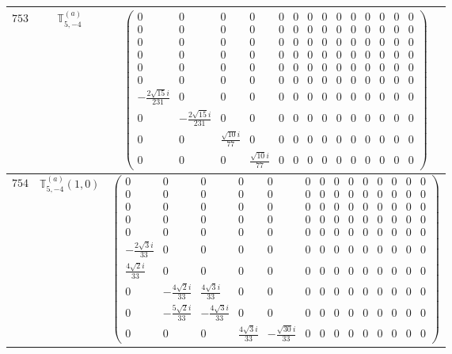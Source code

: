 \documentclass[fleqn,8pt,landscape]{jsarticle}
\begin{document}
\begin{center}
\begin{longtable}{ccc}
$ 753 $ & $ \mathbb{T}_{5,-4}^{(a)} $ & $ \begin{pmatrix} 0 & 0 & 0 & 0 & 0 & 0 & 0 & 0 & 0 & 0 & 0 & 0 & 0 & 0 \\ 0 & 0 & 0 & 0 & 0 & 0 & 0 & 0 & 0 & 0 & 0 & 0 & 0 & 0 \\ 0 & 0 & 0 & 0 & 0 & 0 & 0 & 0 & 0 & 0 & 0 & 0 & 0 & 0 \\ 0 & 0 & 0 & 0 & 0 & 0 & 0 & 0 & 0 & 0 & 0 & 0 & 0 & 0 \\ 0 & 0 & 0 & 0 & 0 & 0 & 0 & 0 & 0 & 0 & 0 & 0 & 0 & 0 \\ 0 & 0 & 0 & 0 & 0 & 0 & 0 & 0 & 0 & 0 & 0 & 0 & 0 & 0 \\ - \frac{2 \sqrt{15} i}{231} & 0 & 0 & 0 & 0 & 0 & 0 & 0 & 0 & 0 & 0 & 0 & 0 & 0 \\ 0 & - \frac{2 \sqrt{15} i}{231} & 0 & 0 & 0 & 0 & 0 & 0 & 0 & 0 & 0 & 0 & 0 & 0 \\ 0 & 0 & \frac{\sqrt{10} i}{77} & 0 & 0 & 0 & 0 & 0 & 0 & 0 & 0 & 0 & 0 & 0 \\ 0 & 0 & 0 & \frac{\sqrt{10} i}{77} & 0 & 0 & 0 & 0 & 0 & 0 & 0 & 0 & 0 & 0 \end{pmatrix} $ \\ \hline
$ 754 $ & $ \mathbb{T}_{5,-4}^{(a)}(1,0) $ & $ \begin{pmatrix} 0 & 0 & 0 & 0 & 0 & 0 & 0 & 0 & 0 & 0 & 0 & 0 & 0 & 0 \\ 0 & 0 & 0 & 0 & 0 & 0 & 0 & 0 & 0 & 0 & 0 & 0 & 0 & 0 \\ 0 & 0 & 0 & 0 & 0 & 0 & 0 & 0 & 0 & 0 & 0 & 0 & 0 & 0 \\ 0 & 0 & 0 & 0 & 0 & 0 & 0 & 0 & 0 & 0 & 0 & 0 & 0 & 0 \\ 0 & 0 & 0 & 0 & 0 & 0 & 0 & 0 & 0 & 0 & 0 & 0 & 0 & 0 \\ - \frac{2 \sqrt{3} i}{33} & 0 & 0 & 0 & 0 & 0 & 0 & 0 & 0 & 0 & 0 & 0 & 0 & 0 \\ \frac{4 \sqrt{2} i}{33} & 0 & 0 & 0 & 0 & 0 & 0 & 0 & 0 & 0 & 0 & 0 & 0 & 0 \\ 0 & - \frac{4 \sqrt{2} i}{33} & \frac{4 \sqrt{3} i}{33} & 0 & 0 & 0 & 0 & 0 & 0 & 0 & 0 & 0 & 0 & 0 \\ 0 & - \frac{5 \sqrt{2} i}{33} & - \frac{4 \sqrt{3} i}{33} & 0 & 0 & 0 & 0 & 0 & 0 & 0 & 0 & 0 & 0 & 0 \\ 0 & 0 & 0 & \frac{4 \sqrt{3} i}{33} & - \frac{\sqrt{30} i}{33} & 0 & 0 & 0 & 0 & 0 & 0 & 0 & 0 & 0 \end{pmatrix} $ \\ \hline

\end{longtable}
\end{center}
\end{document}
